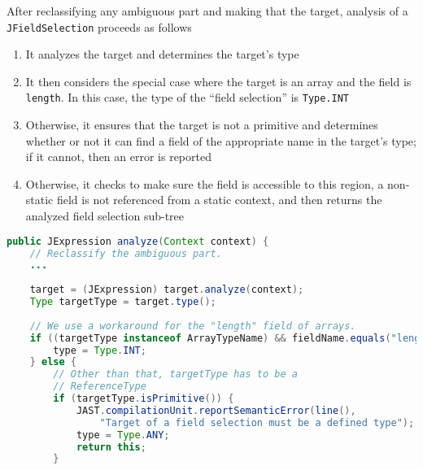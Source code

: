 \documentclass[8pt,a4paper,compress]{beamer}
\begin{document}
\begin{frame}[fragile]
\pause

After reclassifying any ambiguous part and making that the target, analysis of a \lstinline{JFieldSelection} proceeds as follows
\begin{enumerate}
\pause
\item It analyzes the target and determines the target's type
\pause
\item It then considers the special case where the target is an array and the field is \lstinline{length}.  In this case, the type of the ``field selection'' is \lstinline{Type.INT}
\pause
\item Otherwise, it ensures that the target is not a primitive and determines whether or not it can find a field of the appropriate name in the target's type; if it cannot, then an error is reported
\pause
\item Otherwise, it checks to make sure the field is accessible to this region, a non-static field is not referenced from a static context, and then returns the analyzed field selection sub-tree
\end{enumerate}

\pause
\bigskip

\begin{lstlisting}[language=Java,style=focusin]
public JExpression analyze(Context context) {
    // Reclassify the ambiguous part.
    ...
    
    target = (JExpression) target.analyze(context);
    Type targetType = target.type();
    
    // We use a workaround for the "length" field of arrays.
    if ((targetType instanceof ArrayTypeName) && fieldName.equals("length")) {
        type = Type.INT;
    } else {
        // Other than that, targetType has to be a
        // ReferenceType
        if (targetType.isPrimitive()) {
            JAST.compilationUnit.reportSemanticError(line(),
                "Target of a field selection must be a defined type");
            type = Type.ANY;
            return this;
        }
\end{lstlisting}
\end{frame}
\end{document}
